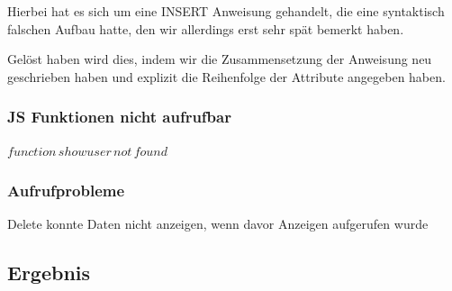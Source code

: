 Hierbei hat es sich um eine INSERT Anweisung gehandelt, die eine syntaktisch falschen Aufbau hatte, den wir allerdings erst sehr spät bemerkt haben. 

Gelöst haben wird dies, indem wir die Zusammensetzung der Anweisung neu geschrieben haben und explizit die Reihenfolge der Attribute angegeben haben.

\subsubsection{JS Funktionen nicht aufrufbar}$ function\,showuser\,not\,found $ 

\subsubsection{Aufrufprobleme}Delete konnte Daten nicht anzeigen, wenn davor Anzeigen aufgerufen wurde


\subsection{Ergebnis}

